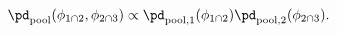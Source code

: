 \begin{equation}
  \pd_{\text{pool}} (\phi_{1 \cap 2}, \phi_{2 \cap 3}) \propto 
  \pd_{\text{pool}, 1}(\phi_{1 \cap 2}) \pd_{\text{pool}, 2}(\phi_{2 \cap 3}).
  \label{eqn:silly-linear-overall}
\end{equation}